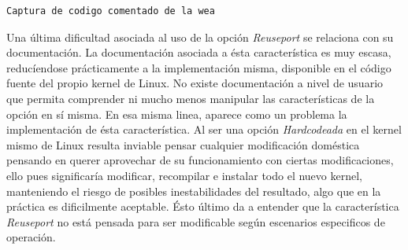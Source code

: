 \begin{lstlisting}[caption=ESO]
Captura de codigo comentado de la wea
\end{lstlisting}

Una última dificultad asociada al uso de la opción \emph{Reuseport} se relaciona con su documentación. La documentación asociada a ésta característica es muy escasa, reducíendose prácticamente a la implementación misma, disponible en el código fuente del propio kernel de Linux. No existe documentación a nivel de usuario que permita comprender ni mucho menos manipular las características de la opción en sí misma. En esa misma linea, aparece como un problema la implementación de ésta característica. Al ser una opción \emph{Hardcodeada} en el kernel mismo de Linux resulta inviable pensar cualquier modificación doméstica pensando en querer aprovechar de su funcionamiento con ciertas modificaciones, ello pues significaría modificar, recompilar e instalar todo el nuevo kernel, manteniendo el riesgo de posibles inestabilidades del resultado, algo que en la práctica es dificilmente aceptable. Ésto último da a entender que la característica \emph{Reuseport} no está pensada para ser modificable según escenarios especificos de operación.
